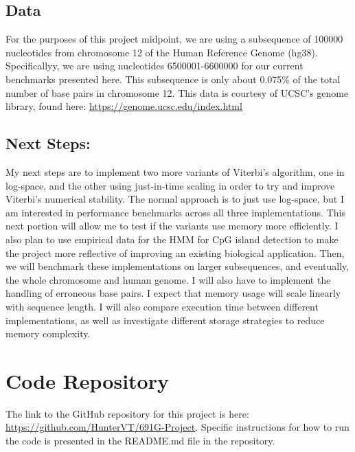 \documentclass{article}
\begin{document}
\subsection{Data}
For the purposes of this project midpoint, we are using a subsequence of 100000 nucleotides from chromosome 12 of the Human Reference Genome (hg38). Specificallyy, we are using nucleotides 6500001-6600000 for our current benchmarks presented here. This subsequence is only about 0.075\% of the total number of base pairs in chromosome 12. This data is courtesy of UCSC's genome library, found here: \href{https://genome.ucsc.edu/index.html}{https://genome.ucsc.edu/index.html}
\subsection{Next Steps: }
My next steps are to implement two more variants of Viterbi's algorithm, one in log-space, and the other using just-in-time scaling in order to try and improve Viterbi's numerical stability. The normal approach is to just use log-space, but I am interested in performance benchmarks across all three implementations. This next portion will allow me to test if the variants use memory more efficiently. I also plan to use empirical data for the HMM for CpG island detection to make the project more reflective of improving an existing biological application. Then, we will benchmark these implementations on larger subsequences, and eventually, the whole chromosome and human genome. I will also have to implement the handling of erroneous base pairs. I expect that memory usage will scale linearly with sequence length. I will also compare execution time between different implementations, as well as investigate different storage strategies to reduce memory complexity.

\section{Code Repository}
The link to the GitHub repository for this project is here: \href{https://github.com/HunterVT/691G-Project}{https://github.com/HunterVT/691G-Project}. Specific instructions for how to run the code is presented in the README.md file in the repository. 
\end{document}
